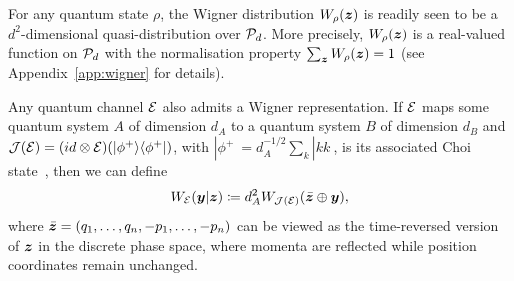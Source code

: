 \documentclass[pra,
aps,
twocolumn,
superscriptaddress,
groupedaddress,
nofootinbib,
reprint
]{revtex4-1}
\begin{document}
For any quantum state $\rho$, the Wigner distribution $W_\rho(\bmz)$ is readily seen to be a $d^2$-dimensional quasi-distribution over $\cal{P}_d$. More precisely, $W_\rho(\bmz)$ is a real-valued function on $\P_d$ with the normalisation property $\sum_{\bmz} W_\rho(\bmz) = 1$ (see Appendix~\ref{app:wigner} for details).

Any quantum channel $\E$ also admits a Wigner representation. If $\E$ maps some quantum system $A$ of dimension $d_A$ to a quantum system $B$ of dimension $d_B$ and $\J(\E) = (id \otimes \E) (|\phi^+\> \<\phi^+|)$, with $|\phi^+\> = d_A^{-1/2} \sum_k |kk\>$, is its associated Choi state~\cite{watrous_2018}, then we can define
\begin{equation}\label{Wigner-Choi}
W_{\E}(\y |\bmz) \coloneqq d_A^2 W_{\J(\E)}(\bar{\bmz} \oplus \y),
\end{equation}
where $\bar{\bmz} = (q_1, \dots, q_n, -p_1, \dots, -p_n)$ can be viewed as the time-reversed version of $\bmz$ in the discrete phase space, where momenta are reflected while position coordinates remain unchanged.
\end{document}
